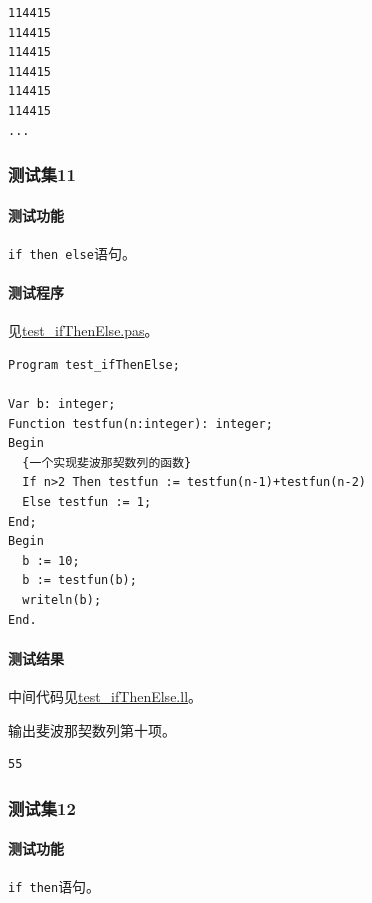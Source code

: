 \documentclass[lang=cn,11pt,a4paper,cite=authornum]{paper}
\begin{document}
\begin{code}
    \begin{verbatim}
114415
114415
114415
114415
114415
114415
...
\end{verbatim}
\end{code}

\subsubsection{测试集11}

\paragraph{测试功能} \texttt{if then else}语句。

\paragraph{测试程序} 见\href{run:../test/test_ifThenElse.pas}{test\_ifThenElse.pas}。

\begin{code}
    \begin{verbatim}
Program test_ifThenElse;

Var b: integer;
Function testfun(n:integer): integer;
Begin
  {一个实现斐波那契数列的函数}
  If n>2 Then testfun := testfun(n-1)+testfun(n-2)
  Else testfun := 1;
End;
Begin
  b := 10;
  b := testfun(b);
  writeln(b);
End.
\end{verbatim}
\end{code}

\paragraph{测试结果} 中间代码见\href{run:../test/test_ifThenElse.ll}{test\_ifThenElse.ll}。

输出斐波那契数列第十项。

\begin{code}
    \begin{verbatim}
55
\end{verbatim}
\end{code}

\subsubsection{测试集12}

\paragraph{测试功能} \texttt{if then}语句。
\end{document}
